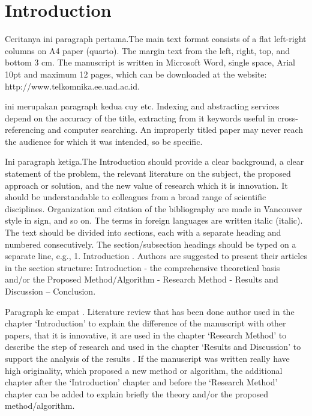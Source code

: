 \section{Introduction}
\label{Introduction}
Ceritanya ini paragraph pertama\cite{awangga2018ontology}.The main text format consists of a flat left-right columns on A4 paper (quarto)\cite{armiati2018national}. The margin text from the left, right, top, and bottom 3 cm\cite{setyawan2018comparison}. The manuscript is written in Microsoft Word\cite{pane2018analysis}, single space, Arial 10pt and maximum 12 pages\cite{awangga2019implementation}, which can be downloaded at the website: http://www.telkomnika.ee.uad.ac.id\cite{awangga2017colenak}.

ini merupakan paragraph kedua cuy etc\cite{awangga2019kafa}. Indexing and abstracting services depend on the accuracy of the title\cite{awangga2019ontology}, extracting from it keywords useful in cross-referencing and computer searching\cite{maulani2018analysis}. An improperly titled paper may never reach the audience for which it was intended\cite{harani2018improving}, so be specific\cite{awangga2018k}.

Ini paragraph ketiga\cite{yulita2018feature}.The Introduction should provide a clear background\cite{pane2019rfid}, a clear statement of the problem, the relevant literature on the subject, the proposed approach or solution, and the new value of research which it is innovation. It should be understandable to colleagues from a broad range of scientific disciplines. Organization and citation of the bibliography are made in Vancouver style in sign, and so on. The terms in foreign languages are written italic (italic)\cite{awangga2018sampeu}. The text should be divided into sections, each with a separate heading and numbered consecutively. The section/subsection headings should be typed on a separate line, e.g., 1. Introduction . Authors are suggested to present their articles in the section structure: Introduction - the comprehensive theoretical basis and/or the Proposed Method/Algorithm - Research Method - Results and Discussion – Conclusion\cite{pane2018qualitative}.

Paragraph ke empat . Literature review that has been done author used in the chapter `Introduction' to explain the difference of the manuscript with other papers, that it is innovative, it are used in the chapter `Research Method' to describe the step of research and used in the chapter `Results and Discussion' to support the analysis of the results . If the manuscript was written really have high originality, which proposed a new method or algorithm, the additional chapter after the `Introduction' chapter and before the `Research Method' chapter can be added to explain briefly the theory and/or the proposed method/algorithm\cite{setyawan2018analysis}.